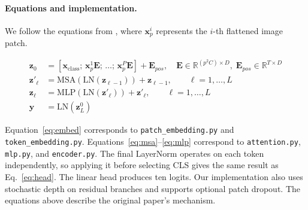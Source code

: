 \documentclass{article}
\begin{document}
\paragraph{Equations and implementation.}
We follow the equations from \citet{dosovitskiy2021image},
where $\mathbf{x}_p^i$ represents the $i$-th flattened
image patch.

\begin{align}
\mathbf{z}_0 &= [\mathbf{x}_{\text{class}};\,
  \mathbf{x}_p^1\mathbf{E};\,\dots;\,\mathbf{x}_p^P\mathbf{E}]
  + \mathbf{E}_{pos},
  \quad \mathbf{E}\in\mathbb{R}^{(p^2C)\times D},\;
  \mathbf{E}_{pos}\in\mathbb{R}^{T\times D}
  \label{eq:embed}\\
\mathbf{z}'_\ell &= \mathrm{MSA}(\mathrm{LN}(\mathbf{z}_{\ell-1}))
  + \mathbf{z}_{\ell-1}, \qquad \ell=1,\dots,L
  \label{eq:msa}\\
\mathbf{z}_\ell &= \mathrm{MLP}(\mathrm{LN}(\mathbf{z}'_\ell))
  + \mathbf{z}'_\ell, \qquad \ell=1,\dots,L
  \label{eq:mlp}\\
\mathbf{y} &= \mathrm{LN}(\mathbf{z}_L^0)
  \label{eq:head}
\end{align}

Equation~\ref{eq:embed} corresponds to \texttt{patch\_embedding.py} and \texttt{token\_embedding.py}. Equations~\ref{eq:msa}--\ref{eq:mlp} correspond to \texttt{attention.py}, \texttt{mlp.py}, and \texttt{encoder.py}. The final LayerNorm operates on each token independently, so applying it before selecting CLS gives the same result as Eq.~\ref{eq:head}. The linear head produces ten logits. Our implementation also uses stochastic depth on residual branches and supports optional patch dropout. The equations above describe the original paper's mechanism.

\newcommand{\archbox}[2]{%
  \fcolorbox{#1!60}{#1!6}{%
    \parbox[c][1.6cm][c]{0.18\linewidth}{%
      \centering\scriptsize #2%
    }%
  }%
}
\end{document}
